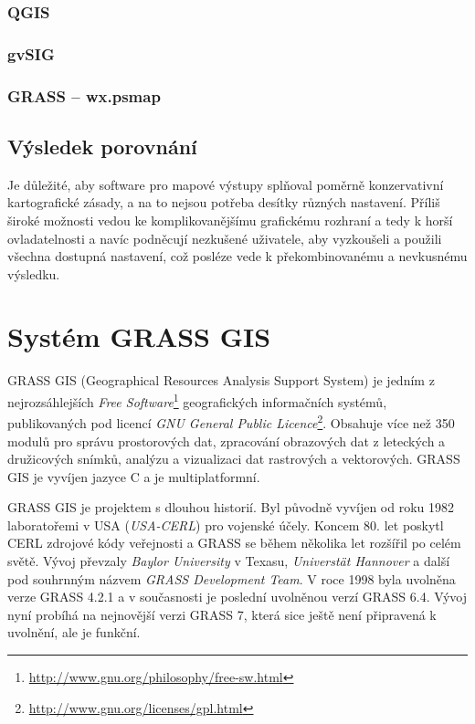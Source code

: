 \documentclass[a4paper,12pt,draft]{article}
\begin{document}
\subsubsection{QGIS}

\subsubsection{gvSIG}



\subsubsection{GRASS -- wx.psmap}

\subsection{Výsledek porovnání}
Je důležité, aby software pro mapové výstupy splňoval poměrně
konzervativní kartografické zásady, a na to nejsou potřeba
desítky různých nastavení. Příliš široké možnosti vedou ke
komplikovanějšímu grafickému rozhraní a tedy k horší ovladatelnosti
a navíc podněcují nezkušené uživatele, aby vyzkoušeli a použili
všechna dostupná nastavení, což posléze vede k překombinovanému a
nevkusnému výsledku.


\section{Systém GRASS GIS}
\label{sec:grass}
GRASS GIS (Geographical Resources Analysis Support
System) je jedním z nejrozsáhlejších \emph{Free
Software}\footnote{\url{http://www.gnu.org/philosophy/free-sw.html}}
geografických informačních systémů,
publikovaných pod licencí \emph{GNU General Public
Licence}\footnote{\url{http://www.gnu.org/licenses/gpl.html}}. Obsahuje více
než 350 modulů pro správu prostorových dat, zpracování obrazových dat
z leteckých a družicových snímků, analýzu a vizualizaci dat rastrových
a vektorových. GRASS GIS je vyvíjen jazyce C a je multiplatformní.

GRASS GIS je projektem s dlouhou historií. Byl původně vyvíjen od roku
1982 laboratořemi v USA (\emph{USA-CERL}) pro vojenské účely. Koncem
80. let poskytl CERL zdrojové kódy veřejnosti a GRASS se během několika
let rozšířil po celém světě. Vývoj převzaly \emph{Baylor University}
v Texasu, \emph{Universtät Hannover} a další pod souhrnným názvem
\emph{GRASS Development Team}. V roce 1998 byla uvolněna verze GRASS
4.2.1 a v současnosti je poslední uvolněnou verzí GRASS 6.4. Vývoj
nyní probíhá na nejnovější verzi GRASS 7, která sice ještě není
připravená k uvolnění, ale je funkční.
\end{document}
